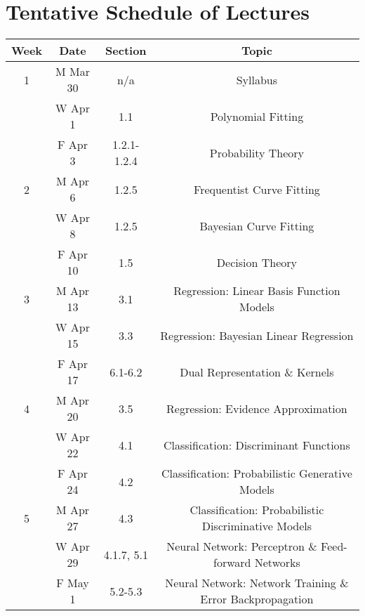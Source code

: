\documentclass[11pt]{article}
\begin{document}
\section*{Tentative Schedule of Lectures}
\begin{tabular*}{\textwidth}{cccc}

Week & Date & Section & Topic \\
\hline
1 & M Mar 30 &   n/a   & Syllabus \\
  & W Apr 1  &   1.1   & Polynomial Fitting \\
  & F Apr 3  & 1.2.1-1.2.4   & Probability Theory \\
 
\hline

2 & M Apr 6  & 1.2.5   & Frequentist Curve Fitting \\
  & W Apr 8  & 1.2.5   & Bayesian Curve Fitting \\
  & F Apr 10 &   1.5   & Decision Theory \\
 
\hline

3 & M Apr 13 &   3.1   & Regression: Linear Basis Function Models \\
  & W Apr 15 &   3.3   & Regression: Bayesian Linear Regression \\
  & F Apr 17 & 6.1-6.2 & Dual Representation \& Kernels \\
 
\hline

4 & M Apr 20 &   3.5   & Regression: Evidence Approximation \\ %
  & W Apr 22 &   4.1   & Classification: Discriminant Functions \\
  & F Apr 24 &   4.2   & Classification: Probabilistic Generative Models \\
  
 
\hline

5 & M Apr 27 &   4.3   & Classification: Probabilistic Discriminative Models \\
  & W Apr 29 & 4.1.7, 5.1 & Neural Network: Perceptron \& Feed-forward Networks \\
  & F May 1  & 5.2-5.3 & Neural Network: Network Training \& Error Backpropagation\\
 

\end{tabular*}
\end{document}
